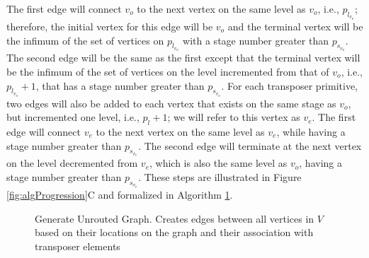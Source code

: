The first edge will connect $v_o$ to the next vertex on the same level as $v_o$, i.e., $p_{l_{v_o}}$; therefore, the initial vertex for this edge will be $v_o$ and the terminal vertex will be the infimum of the set of vertices on $p_{l_{v_o}}$ with a stage number greater than $p_{s_{v_o}}$. The second edge will be the same as the first except that the terminal vertex will be the infimum of the set of vertices on the level incremented from that of $v_o$, i.e., $p_{l_{v_o}}+1$, that has a stage number greater than $p_{s_{v_o}}$. For each transposer primitive, two edges will also be added to each vertex that exists on the same stage as $v_o$, but incremented one level, i.e., $p_l+1$; we will refer to this vertex as $v_e$. The first edge will connect $v_e$ to the next vertex on the same level as $v_e$, while having a stage number greater than $p_{s_{v_e}}$. The second edge will terminate at the next vertex on the level decremented from $v_e$, which is also the same level as $v_o$, having a stage number greater than $p_{s_{v_e}}$. These steps are illustrated in Figure \ref{fig:algProgression}C and formalized in Algorithm \ref{alg:GenerateGraph}.

\begin{figure}
\begin{algorithm}[H]
\DontPrintSemicolon
{}
\caption{Generate Unrouted Graph. Creates edges between all vertices in $V$ based on their locations on the graph and their association with transposer elements \label{alg:GenerateGraph}}
\end{algorithm}
\end{figure}

